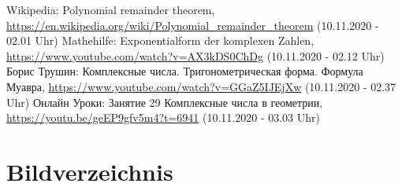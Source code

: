 \documentclass[a4paper,12pt]{article} %
\begin{document}
\renewcommand{\refname}{Internetquellen}  %

\begin{thebibliography}{9}
	 Wikipedia: Polynomial remainder theorem, \url{https://en.wikipedia.org/wiki/Polynomial_remainder_theorem} (10.11.2020 - 02.01 Uhr)
	 Mathehilfe: Exponentialform der komplexen Zahlen, \url{https://www.youtube.com/watch?v=AX3kDS0ChDg} (10.11.2020 - 02.12 Uhr)
	 Борис Трушин: Комплексные числа. Тригонометрическая форма. Формула Муавра, \url{https://www.youtube.com/watch?v=GGaZ5IJEjXw} (10.11.2020 - 02.37 Uhr)
	 Онлайн Уроки: Занятие 29 Комплексные числа в геометрии, \url{https://youtu.be/geEP9gfv5m4?t=6941} (10.11.2020 - 03.03 Uhr)
\end{thebibliography}


\section{Bildverzeichnis}
\small
\listoffigures
\end{document}
